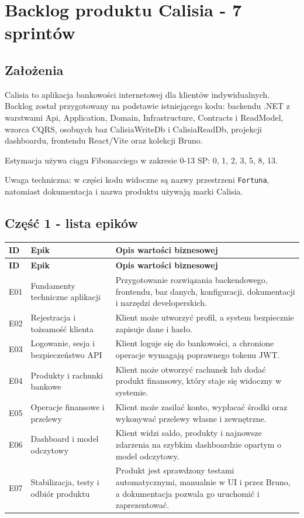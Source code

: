 \documentclass[12pt,a4paper]{article}
\begin{document}
\section*{Backlog produktu Calisia - 7 sprintów}

\subsection*{Założenia}

Calisia to aplikacja bankowości internetowej dla klientów indywidualnych. Backlog został przygotowany na podstawie istniejącego kodu: backendu .NET z warstwami Api, Application, Domain, Infrastructure, Contracts i ReadModel, wzorca CQRS, osobnych baz CalisiaWriteDb i CalisiaReadDb, projekcji dashboardu, frontendu React/Vite oraz kolekcji Bruno.

Estymacja używa ciągu Fibonacciego w zakresie 0-13 SP: 0, 1, 2, 3, 5, 8, 13.

Uwaga techniczna: w części kodu widoczne są nazwy przestrzeni \texttt{Fortuna}, natomiast dokumentacja i nazwa produktu używają marki Calisia.

\subsection*{Część 1 - lista epików}

\begingroup
\footnotesize
{}
\begin{longtable}{@{}L{0.10\textwidth}L{0.27\textwidth}L{0.57\textwidth}@{}}
\toprule
{}
\textbf{ID} & \textbf{Epik} & \textbf{Opis wartości biznesowej} \\
\midrule
\endfirsthead
\toprule
{}
\textbf{ID} & \textbf{Epik} & \textbf{Opis wartości biznesowej} \\
\midrule
\endhead
E01 & Fundamenty techniczne aplikacji & Przygotowanie rozwiązania backendowego, frontendu, baz danych, konfiguracji, dokumentacji i narzędzi developerskich. \\
E02 & Rejestracja i tożsamość klienta & Klient może utworzyć profil, a system bezpiecznie zapisuje dane i hasło. \\
E03 & Logowanie, sesja i bezpieczeństwo API & Klient loguje się do bankowości, a chronione operacje wymagają poprawnego tokenu JWT. \\
E04 & Produkty i rachunki bankowe & Klient może otworzyć rachunek lub dodać produkt finansowy, który staje się widoczny w systemie. \\
E05 & Operacje finansowe i przelewy & Klient może zasilać konto, wypłacać środki oraz wykonywać przelewy własne i zewnętrzne. \\
E06 & Dashboard i model odczytowy & Klient widzi saldo, produkty i najnowsze zdarzenia na szybkim dashboardzie opartym o model odczytowy. \\
E07 & Stabilizacja, testy i odbiór produktu & Produkt jest sprawdzony testami automatycznymi, manualnie w UI i przez Bruno, a dokumentacja pozwala go uruchomić i zaprezentować. \\
\bottomrule
\end{longtable}
\endgroup
\end{document}
